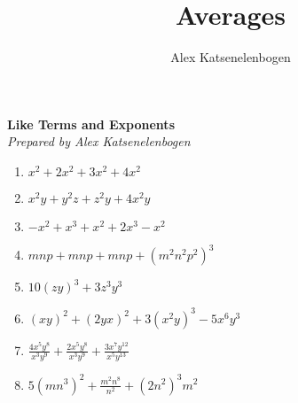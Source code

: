 \documentclass{article}
\title{Averages}
\author{Alex Katsenelenbogen}
\begin{document}
\begin{center}
      \Large\textbf{Like Terms and Exponents}\\
      \large\textit{Prepared by Alex Katsenelenbogen}
\end{center}

\vspace{10 mm}

\begin{enumerate}
\item
$x^2 + 2x^2 + 3x^2 + 4x^2$
\item
$x^2y + y^2z + z^2y + 4x^2y$
\item
$-x^2 + x^3 + x^2 + 2x^3 - x^2$
\item
$mnp + mnp + mnp + (m^2n^2p^2)^3$
\item
$10(zy)^3 + 3z^3y^3$
\item
$(xy)^2 + (2yx)^2 + 3(x^2y)^3 - 5x^6y^3$
\item
$\frac{4x^5y^8}{x^3y^9} + \frac{2x^5y^8}{x^3y^9} + \frac{3x^7y^12}{x^5y^13}$
\item
$5(mn^3)^2 + \frac{m^2n^8}{n^2} + (2n^2)^3m^2$
\end{enumerate}
\end{document}
